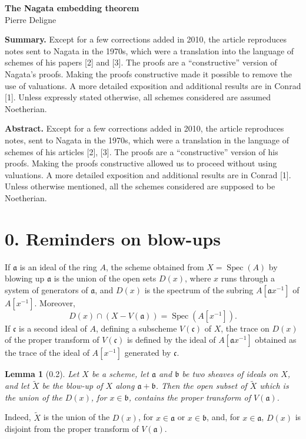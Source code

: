 \documentclass[10pt,a4paper]{article}
\newcommand{\Spec}{\operatorname{Spec}}
\theoremstyle{deligne}
\newtheorem*{lemma*}{Lemma}
\newcommand{\heading}[1]{\vspace{0.65em}\noindent{\bfseries #1}\quad}
\begin{document}
\begin{center}
{\Large\bfseries The Nagata embedding theorem}\\[0.4em]
{\large Pierre Deligne}
\end{center}

\textbf{Summary.} Except for a few corrections added in 2010, the article reproduces notes sent to Nagata in the 1970s, which were a translation into the language of schemes of his papers [2] and [3]. The proofs are a ``constructive'' version of Nagata's proofs. Making the proofs constructive made it possible to remove the use of valuations. A more detailed exposition and additional results are in Conrad [1]. Unless expressly stated otherwise, all schemes considered are assumed Noetherian.

\textbf{Abstract.} Except for a few corrections added in 2010, the article reproduces notes, sent to Nagata in the 1970s, which were a translation in the language of schemes of his articles [2], [3]. The proofs are a ``constructive'' version of his proofs. Making the proofs constructive allowed us to proceed without using valuations. A more detailed exposition and additional results are in Conrad [1]. Unless otherwise mentioned, all the schemes considered are supposed to be Noetherian.

\section*{0. Reminders on blow-ups}

\heading{0.1.}
If \(\mathfrak a\) is an ideal of the ring \(A\), the scheme obtained from \(X=\Spec(A)\) by blowing up \(\mathfrak a\) is the union of the open sets \(D(x)\), where \(x\) runs through a system of generators of \(\mathfrak a\), and \(D(x)\) is the spectrum of the subring \(A[\mathfrak a x^{-1}]\) of \(A[x^{-1}]\). Moreover,
\[
D(x)\cap (X-V(\mathfrak a))=\Spec(A[x^{-1}]).
\]
If \(\mathfrak c\) is a second ideal of \(A\), defining a subscheme \(V(\mathfrak c)\) of \(X\), the trace on \(D(x)\) of the proper transform of \(V(\mathfrak c)\) is defined by the ideal of \(A[\mathfrak a x^{-1}]\) obtained as the trace of the ideal of \(A[x^{-1}]\) generated by \(\mathfrak c\).

\begin{lemma*}[0.2]
Let \(X\) be a scheme, let \(\mathfrak a\) and \(\mathfrak b\) be two sheaves of ideals on \(X\), and let \(\widetilde X\) be the blow-up of \(X\) along \(\mathfrak a+\mathfrak b\). Then the open subset of \(\widetilde X\) which is the union of the \(D(x)\), for \(x\in\mathfrak b\), contains the proper transform of \(V(\mathfrak a)\).
\end{lemma*}
Indeed, \(\widetilde X\) is the union of the \(D(x)\), for \(x\in\mathfrak a\) or \(x\in\mathfrak b\), and, for \(x\in\mathfrak a\), \(D(x)\) is disjoint from the proper transform of \(V(\mathfrak a)\).
\end{document}
